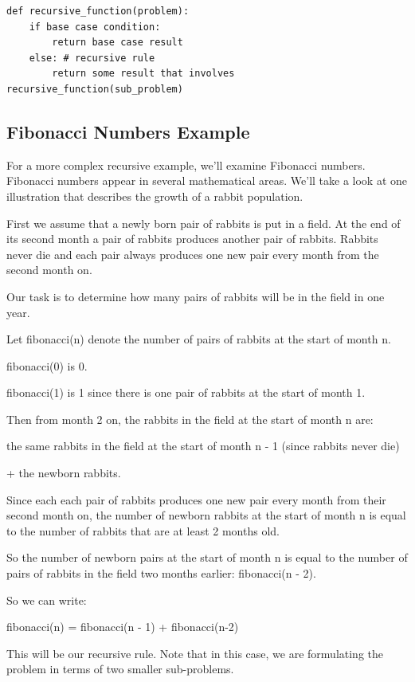 \documentclass{article}
\begin{document}
\begin{lstlisting}
def recursive_function(problem):
    if base case condition:
        return base case result
    else: # recursive rule
        return some result that involves recursive_function(sub_problem)
\end{lstlisting}

\subsection{Fibonacci Numbers Example}

For a more complex recursive example, we'll examine Fibonacci numbers.  Fibonacci numbers appear in several mathematical areas.  We'll take a look at one illustration that describes the growth of a rabbit population.

First we assume that a newly born pair of rabbits is put in a field. At the end of its second month a pair of rabbits produces another pair of rabbits.  Rabbits never die and each pair always produces one new pair every month from the second month on.

Our task is to determine how many pairs of rabbits will be in the field in one year.

Let fibonacci(n) denote the number of pairs of rabbits at the start of month n.

fibonacci(0) is 0.

fibonacci(1) is  1 since there is one pair of rabbits at the start of month 1.

Then from month 2 on, the rabbits in the field at the start of month n are:

the same rabbits in the field at the start of month  n - 1 (since rabbits never die)

+ the newborn rabbits.

Since each  each pair of rabbits  produces one new pair every month from their second month on, the number of newborn rabbits at the start of month n is equal to the number of rabbits that are at least 2 months old.

So the number of newborn pairs at the start of month n is equal to the number of pairs of rabbits in the field two months earlier: fibonacci(n - 2).

So we can write:

fibonacci(n) = fibonacci(n - 1) + fibonacci(n-2)

This will be our recursive rule.  Note that in this case, we are formulating the problem in terms of two smaller sub-problems.
\end{document}

